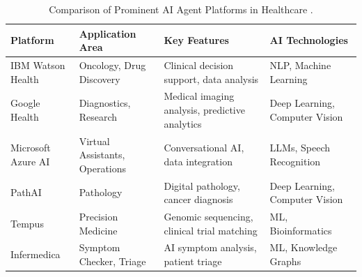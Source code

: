 \documentclass[12pt,a4paper]{article}
\begin{document}
\begin{table}[H]
    \centering
    \caption{Comparison of Prominent AI Agent Platforms in Healthcare \cite{ibm_watson_health,google_health,microsoft_azure_ai,pathai,tempus,infermedica_platform}.}
    \label{tab:ai_platforms}
    \begin{tabular}{>{\raggedright\arraybackslash}p{2.8cm}
                    >{\raggedright\arraybackslash}p{2.5cm}
                    >{\raggedright\arraybackslash}p{3.8cm}
                    >{\raggedright\arraybackslash}p{3.5cm}}
        \toprule
        \textbf{Platform} & \textbf{Application Area} & \textbf{Key Features} & \textbf{AI Technologies} \\
        \midrule
        IBM Watson Health & Oncology, Drug Discovery & Clinical decision support, data analysis & NLP, Machine Learning \\
        \addlinespace
        Google Health & Diagnostics, Research & Medical imaging analysis, predictive analytics & Deep Learning, Computer Vision \\
        \addlinespace
        Microsoft Azure AI & Virtual Assistants, Operations & Conversational AI, data integration & LLMs, Speech Recognition \\
        \addlinespace
        PathAI & Pathology & Digital pathology, cancer diagnosis & Deep Learning, Computer Vision \\
        \addlinespace
        Tempus & Precision Medicine & Genomic sequencing, clinical trial matching & ML, Bioinformatics \\
        \addlinespace
        Infermedica & Symptom Checker, Triage & AI symptom analysis, patient triage & ML, Knowledge Graphs \\
        \bottomrule
    \end{tabular}
\end{table}
\end{document}

